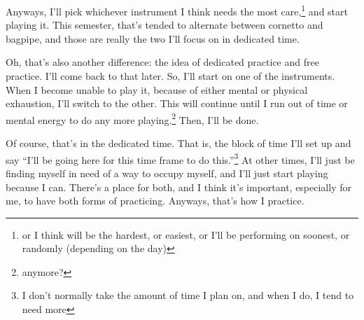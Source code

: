\documentclass[12pt]{article}[titlepage]
\newcommand{\say}[1]{``#1''}
\newcommand{\1}{\={a}}
\newcommand{\2}{\={e}}
\newcommand{\3}{\={\i}}
\newcommand{\4}{\=o}
\newcommand{\5}{\=u}
\newcommand{\6}{\={A}}
\renewcommand{\,}{\textsuperscript{,}}
\begin{document}
Anyways, I'll pick whichever instrument I think needs the most care,\footnote{or I think will be the hardest, or easiest, or I'll be performing on soonest, or randomly (depending on the day)} and start playing it.
This semester, that's tended to alternate between cornetto and bagpipe, and those are really the two I'll focus on in dedicated time.

Oh, that's also another difference: the idea of dedicated practice and free practice.
I'll come back to that later.
So, I'll start on one of the instruments.
When I become unable to play it, because of either mental or physical exhaustion, I'll switch to the other.
This will continue until I run out of time or mental energy to do any more playing.\footnote{anymore?}
Then, I'll be done.

Of course, that's in the dedicated time.
That is, the block of time I'll set up and say \say{I'll be going here for this time frame to do this.}\footnote{I don't normally take the amount of time I plan on, and when I do, I tend to need more}
At other times, I'll just be finding myself in need of a way to occupy myself, and I'll just start playing because I can.
There's a place for both, and I think it's important, especially for me, to have both forms of practicing.
Anyways, that's how I practice.
\end{document}
